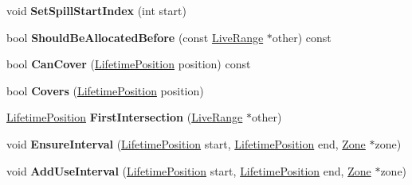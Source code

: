 \begin{DoxyCompactItemize}
\item 
void {\bfseries Set\+Spill\+Start\+Index} (int start)\hypertarget{classv8_1_1internal_1_1_live_range_a8771fd7ef29604d13eb2fc27a88c0eb9}{}\label{classv8_1_1internal_1_1_live_range_a8771fd7ef29604d13eb2fc27a88c0eb9}

\item 
bool {\bfseries Should\+Be\+Allocated\+Before} (const \hyperlink{classv8_1_1internal_1_1_live_range}{Live\+Range} $\ast$other) const \hypertarget{classv8_1_1internal_1_1_live_range_a64375493acd5aceb780a8c67f6489f96}{}\label{classv8_1_1internal_1_1_live_range_a64375493acd5aceb780a8c67f6489f96}

\item 
bool {\bfseries Can\+Cover} (\hyperlink{classv8_1_1internal_1_1_lifetime_position}{Lifetime\+Position} position) const \hypertarget{classv8_1_1internal_1_1_live_range_a75657b5678d8188045ec6be9b3fce06c}{}\label{classv8_1_1internal_1_1_live_range_a75657b5678d8188045ec6be9b3fce06c}

\item 
bool {\bfseries Covers} (\hyperlink{classv8_1_1internal_1_1_lifetime_position}{Lifetime\+Position} position)\hypertarget{classv8_1_1internal_1_1_live_range_a096c7f4e9cc4ee5a9ababe8f6f4476b0}{}\label{classv8_1_1internal_1_1_live_range_a096c7f4e9cc4ee5a9ababe8f6f4476b0}

\item 
\hyperlink{classv8_1_1internal_1_1_lifetime_position}{Lifetime\+Position} {\bfseries First\+Intersection} (\hyperlink{classv8_1_1internal_1_1_live_range}{Live\+Range} $\ast$other)\hypertarget{classv8_1_1internal_1_1_live_range_a6eefd64ee4a61221be0685caae202b77}{}\label{classv8_1_1internal_1_1_live_range_a6eefd64ee4a61221be0685caae202b77}

\item 
void {\bfseries Ensure\+Interval} (\hyperlink{classv8_1_1internal_1_1_lifetime_position}{Lifetime\+Position} start, \hyperlink{classv8_1_1internal_1_1_lifetime_position}{Lifetime\+Position} end, \hyperlink{classv8_1_1internal_1_1_zone}{Zone} $\ast$zone)\hypertarget{classv8_1_1internal_1_1_live_range_a08a9a6f61273cbdf10d2c0bd3f5f8694}{}\label{classv8_1_1internal_1_1_live_range_a08a9a6f61273cbdf10d2c0bd3f5f8694}

\item 
void {\bfseries Add\+Use\+Interval} (\hyperlink{classv8_1_1internal_1_1_lifetime_position}{Lifetime\+Position} start, \hyperlink{classv8_1_1internal_1_1_lifetime_position}{Lifetime\+Position} end, \hyperlink{classv8_1_1internal_1_1_zone}{Zone} $\ast$zone)\hypertarget{classv8_1_1internal_1_1_live_range_a84040c33ef48af318b72ba81e80ab57f}{}\label{classv8_1_1internal_1_1_live_range_a84040c33ef48af318b72ba81e80ab57f}


\end{DoxyCompactItemize}
